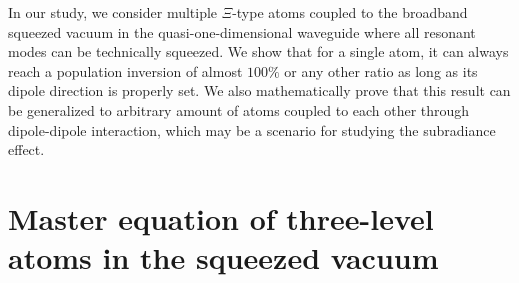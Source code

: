\documentclass[aps,showpacs,twocolumn,twoside,groupedaddress]{revtex4}
\begin{document}
In our study, we consider multiple $\Xi$-type atoms coupled to the broadband squeezed vacuum in the quasi-one-dimensional waveguide where all resonant modes can be technically squeezed. We show that for a single atom, it can always reach a population inversion of almost $100\%$ or any other ratio as long as its dipole direction is properly set. We also mathematically prove that this result can be generalized to arbitrary amount of atoms coupled to each other through dipole-dipole interaction, which may be a scenario for studying the subradiance effect.

\section{Master equation of three-level atoms in the squeezed vacuum}
\end{document}
